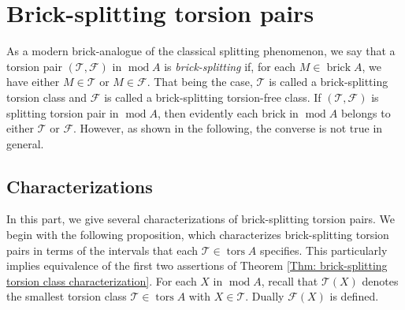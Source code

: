 \documentclass{amsart}
\let\origcontentsline\addcontentsline
\newcommand\resumetoc{\let\addcontentsline\origcontentsline}
\theoremstyle{thmstyle}
\theoremstyle{exstyle}
\theoremstyle{defstyle}
\theoremstyle{remstyle}
\theoremstyle{remstyle}
\DeclareMathOperator*{\modu}{mod}
\DeclareMathOperator*{\brick}{brick}
\DeclareMathOperator*{\tors}{tors}
\begin{document}
\resumetoc

\section{Brick-splitting torsion pairs}\label{Subsection: Brick-splitting pairs}

As a modern brick-analogue of the classical splitting phenomenon, we say that a torsion pair $(\mathcal{T},\mathcal{F})$ in $\modu A$ is \emph{brick-splitting} if, for each $M \in \brick A$, we have either $M \in \mathcal{T}$ or $M \in \mathcal{F}$. That being the case, $\mathcal{T}$ is called a brick-splitting torsion class and $\mathcal{F}$ is called a brick-splitting torsion-free class. 
If $(\mathcal{T},\mathcal{F})$ is splitting torsion pair in $\modu A$, then evidently each brick in $\modu A$ belongs to either $\mathcal{T}$ or $\mathcal{F}$. However, as shown in the following, the converse is not true in general. 

\subsection{Characterizations}
In this part, we give several characterizations of brick-splitting torsion pairs. 
We begin with the following proposition, which characterizes brick-splitting torsion pairs in terms of the intervals that each $\mathcal{T}\in \tors A$ specifies. This particularly implies equivalence of the first two assertions of Theorem \ref{Thm: brick-splitting torsion class characterization}.
For each $X$ in $\modu A$, recall that $\mathcal{T}(X)$ denotes the smallest torsion class $\mathcal{T} \in \tors A$ with $X \in \mathcal{T}$. Dually $\mathcal{F}(X)$ is defined.
\end{document}

